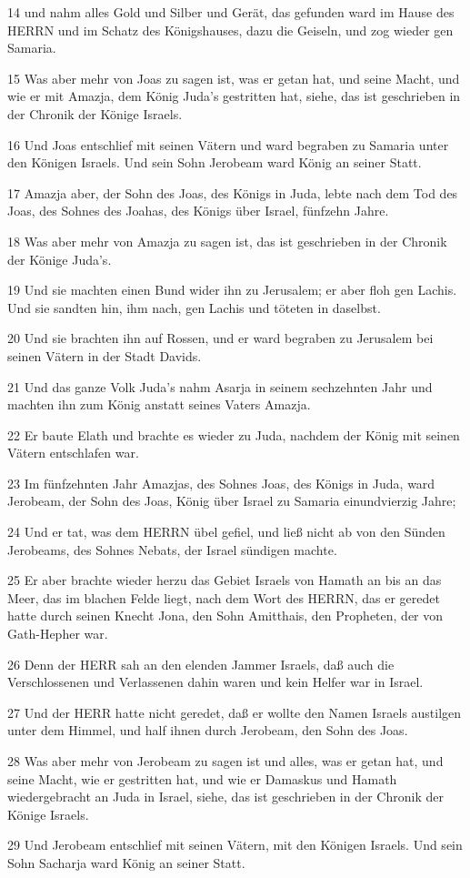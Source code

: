 \par 14 und nahm alles Gold und Silber und Gerät, das gefunden ward im Hause des HERRN und im Schatz des Königshauses, dazu die Geiseln, und zog wieder gen Samaria.
\par 15 Was aber mehr von Joas zu sagen ist, was er getan hat, und seine Macht, und wie er mit Amazja, dem König Juda's gestritten hat, siehe, das ist geschrieben in der Chronik der Könige Israels.
\par 16 Und Joas entschlief mit seinen Vätern und ward begraben zu Samaria unter den Königen Israels. Und sein Sohn Jerobeam ward König an seiner Statt.
\par 17 Amazja aber, der Sohn des Joas, des Königs in Juda, lebte nach dem Tod des Joas, des Sohnes des Joahas, des Königs über Israel, fünfzehn Jahre.
\par 18 Was aber mehr von Amazja zu sagen ist, das ist geschrieben in der Chronik der Könige Juda's.
\par 19 Und sie machten einen Bund wider ihn zu Jerusalem; er aber floh gen Lachis. Und sie sandten hin, ihm nach, gen Lachis und töteten in daselbst.
\par 20 Und sie brachten ihn auf Rossen, und er ward begraben zu Jerusalem bei seinen Vätern in der Stadt Davids.
\par 21 Und das ganze Volk Juda's nahm Asarja in seinem sechzehnten Jahr und machten ihn zum König anstatt seines Vaters Amazja.
\par 22 Er baute Elath und brachte es wieder zu Juda, nachdem der König mit seinen Vätern entschlafen war.
\par 23 Im fünfzehnten Jahr Amazjas, des Sohnes Joas, des Königs in Juda, ward Jerobeam, der Sohn des Joas, König über Israel zu Samaria einundvierzig Jahre;
\par 24 Und er tat, was dem HERRN übel gefiel, und ließ nicht ab von den Sünden Jerobeams, des Sohnes Nebats, der Israel sündigen machte.
\par 25 Er aber brachte wieder herzu das Gebiet Israels von Hamath an bis an das Meer, das im blachen Felde liegt, nach dem Wort des HERRN, das er geredet hatte durch seinen Knecht Jona, den Sohn Amitthais, den Propheten, der von Gath-Hepher war.
\par 26 Denn der HERR sah an den elenden Jammer Israels, daß auch die Verschlossenen und Verlassenen dahin waren und kein Helfer war in Israel.
\par 27 Und der HERR hatte nicht geredet, daß er wollte den Namen Israels austilgen unter dem Himmel, und half ihnen durch Jerobeam, den Sohn des Joas.
\par 28 Was aber mehr von Jerobeam zu sagen ist und alles, was er getan hat, und seine Macht, wie er gestritten hat, und wie er Damaskus und Hamath wiedergebracht an Juda in Israel, siehe, das ist geschrieben in der Chronik der Könige Israels.
\par 29 Und Jerobeam entschlief mit seinen Vätern, mit den Königen Israels. Und sein Sohn Sacharja ward König an seiner Statt.

